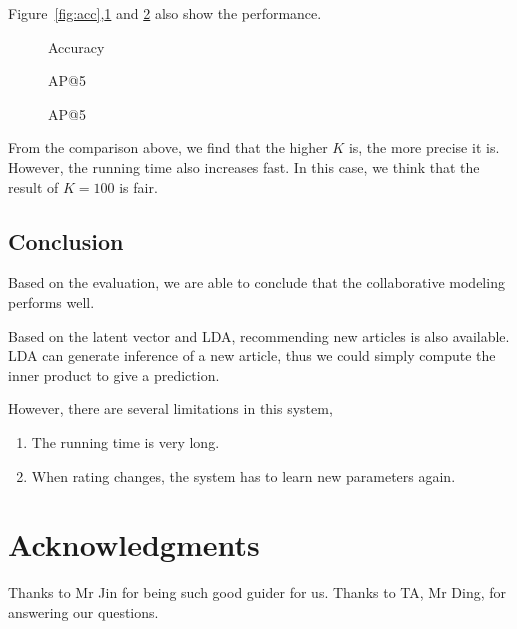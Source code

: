 \documentclass{acm_proc_article-sp}
\begin{document}
Figure~\ref{fig:acc},\ref{fig:ap} and \ref{fig:time} also show the performance.

\begin{figure}[h]
\begin{minipage}[t]{0.45\linewidth}
\centering
{}
\caption{Accuracy\label{fig:acc}}
\end{minipage}
\hfill
\begin{minipage}[t]{0.45\linewidth}
\centering
{}
\caption{AP@5\label{fig:ap}}
\end{minipage}
\end{figure}

\begin{figure}[htbp]
\centering
{}
\caption{AP@5\label{fig:time}}
\end{figure}

From the comparison above, we find that the higher $K$ is, the more precise it is. However, the running time also increases fast. In this case, we think that the result of $K=100$ is fair.

\subsection{Conclusion}
Based on the evaluation, we are able to conclude that the collaborative modeling performs well.

Based on the latent vector and LDA, recommending new articles is also available. LDA can generate inference of a new article, thus we could simply compute the inner product to give a prediction.

However, there are several limitations in this system,
\begin{enumerate}
  \item The running time is very long.
  \item When rating changes, the system has to learn new parameters again.
\end{enumerate}

\section{Acknowledgments}
Thanks to Mr Jin for being such good guider for us. Thanks to TA, Mr Ding, for answering our questions.

%



\balancecolumns
\end{document}
